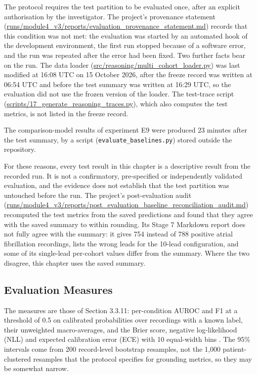 The protocol requires the test partition to be evaluated once, after an explicit authorisation by the investigator. The project's provenance statement (\url{runs/module4_v3/reports/evaluation_provenance_statement.md}) records that this condition was not met: the evaluation was started by an automated hook of the development environment, the first run stopped because of a software error, and the run was repeated after the error had been fixed. Two further facts bear on the run. The data loader (\url{src/reasoning/multi_cohort_loader.py}) was last modified at 16:08 UTC on 15 October 2026, after the freeze record was written at 06:54 UTC and before the test summary was written at 16:29 UTC, so the evaluation did not use the frozen version of the loader. The test-trace script (\url{scripts/17_generate_reasoning_traces.py}), which also computes the test metrics, is not listed in the freeze record.

The comparison-model results of experiment E9 were produced 23 minutes after the test summary, by a script (\texttt{evaluate\_baselines.py}) stored outside the repository.

For these reasons, every test result in this chapter is a descriptive result from the recorded run. It is not a confirmatory, pre-specified or independently validated evaluation, and the evidence does not establish that the test partition was untouched before the run. The project's post-evaluation audit (\url{runs/module4_v3/reports/post_evaluation_baseline_reconciliation_audit.md}) recomputed the test metrics from the saved predictions and found that they agree with the saved summary to within rounding. Its Stage 7 Markdown report does not fully agree with the summary: it gives 754 instead of 788 positive atrial fibrillation recordings, lists the wrong leads for the 10-lead configuration, and some of its single-lead per-cohort values differ from the summary. Where the two disagree, this chapter uses the saved summary.

\subsection{Evaluation Measures}\label{sec:ch4_3_3}

The measures are those of Section 3.3.11: per-condition AUROC and F1 at a threshold of 0.5 on calibrated probabilities over recordings with a known label, their unweighted macro-averages, and the Brier score, negative log-likelihood (NLL) and expected calibration error (ECE) with 10 equal-width bins \cite{GUO2017CALIBRATION}. The 95\% intervals come from 200 record-level bootstrap resamples, not the 1,000 patient-clustered resamples that the protocol specifies for grounding metrics, so they may be somewhat narrow.

